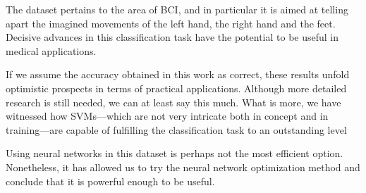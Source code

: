 		The dataset pertains to the area of \acs{BCI}, and in particular it is aimed at telling apart the imagined movements of the left hand, the right hand and the feet. Decisive advances in this classification task have the potential to be useful in medical applications.

		If we assume the accuracy obtained in this work as correct, these results unfold optimistic prospects in terms of practical applications. Although more detailed research is still needed, we can at least say this much. What is more, we have witnessed how \acs{SVM}s---which are not very intricate both in concept and in training---are capable of fulfilling the classification task to an outstanding level

		Using neural networks in this dataset is perhaps not the most efficient option. Nonetheless, it has allowed us to try the neural network optimization method and conclude that it is powerful enough to be useful.